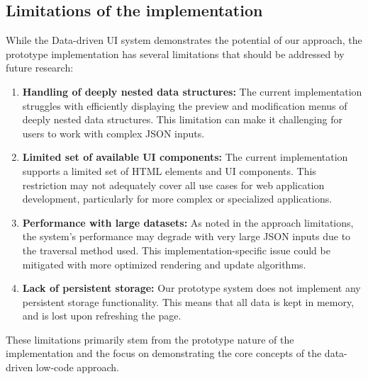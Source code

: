 \subsection{Limitations of the implementation}
While the Data-driven UI system demonstrates the potential of our approach,
the prototype implementation has several limitations that should be addressed by future research:
\begin{enumerate}
	\item \textbf{Handling of deeply nested data structures:}
	      The current implementation struggles with efficiently displaying the preview and modification menus of deeply nested data structures.
	      This limitation can make it challenging for users to work with complex JSON inputs.
	\item \textbf{Limited set of available UI components:} The current implementation supports a limited set of HTML elements and UI components.
	      This restriction may not adequately cover all use cases for web application development, particularly for more complex or specialized applications.
	\item \textbf{Performance with large datasets:}
	      As noted in the approach limitations,
	      the system's performance may degrade with very large JSON inputs due to the traversal method used.
	      This implementation-specific issue could be mitigated with more optimized rendering and update algorithms.
	\item \textbf{Lack of persistent storage:}
	      Our prototype system does not implement any persistent storage functionality.
	      This means that all data is kept in memory, and is lost upon refreshing the page.

\end{enumerate}
These limitations primarily stem from the prototype nature of the implementation and the focus on demonstrating the core concepts of the data-driven low-code approach.

